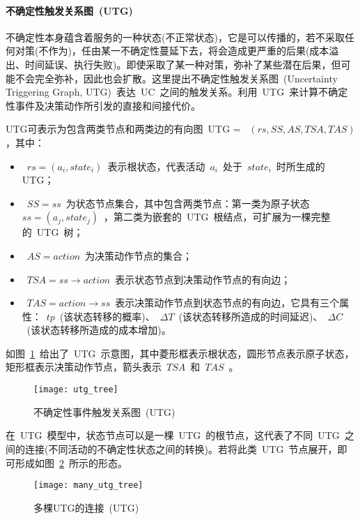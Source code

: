 \paragraph{不确定性触发关系图~(UTG)~} \label{sec:utg}
不确定性本身蕴含着服务的一种状态(不正常状态)，它是可以传播的，若不采取任何对策(不作为)，任由某一不确定性蔓延下去，将会造成更严重的后果(成本溢出、时间延误、执行失败)。即使采取了某一种对策，弥补了某些潜在后果，但可能不会完全弥补，因此也会扩散。这里提出不确定性触发关系图~(Uncertainty Triggering Graph, UTG)~表达~UC~之间的触发关系。利用~UTG~来计算不确定性事件及决策动作所引发的直接和间接代价。

UTG可表示为包含两类节点和两类边的有向图~UTG = ~$(rs, SS, AS, TSA, TAS)$，其中：
\begin{itemize}
    \item ~$rs=(a_i, state_i)$~表示根状态，代表活动~$a_i$~处于~$state_i$~时所生成的UTG；
    \item ~$SS={ss}$~为状态节点集合，其中包含两类节点：第一类为原子状态~$ss=(a_j, state_j)$~，第二类为嵌套的~UTG~根结点，可扩展为一棵完整的~UTG~树；
    \item ~$AS={action}$~为决策动作节点的集合；
    \item ~$TSA=ss \to action$~表示状态节点到决策动作节点的有向边；
    \item ~$TAS=action \to ss$~表示决策动作节点到状态节点的有向边，它具有三个属性：~$tp$~(该状态转移的概率)、~$\Delta T$~(该状态转移所造成的时间延迟)、~$\Delta C$~(该状态转移所造成的成本增加)。
\end{itemize}

如图~\ref{figure:utg_tree}~给出了~UTG~示意图，其中菱形框表示根状态，圆形节点表示原子状态，矩形框表示决策动作节点，箭头表示~$TSA$~和~$TAS$~。

\begin{figure}[htbp]
    \centering
    \texttt{[image: utg\_tree]}
    \caption{不确定性事件触发关系图~(UTG)~}\label{figure:utg_tree}
    \vspace{-1em}
\end{figure}

在~UTG~模型中，状态节点可以是一棵~UTG~的根节点，这代表了不同~UTG~之间的连接(不同活动的不确定性状态之间的转换)。若将此类~UTG~节点展开，即可形成如图~\ref{figure:many_utg_tree}~所示的形态。

\begin{figure}[htbp]
    \centering
    \texttt{[image: many\_utg\_tree]}
    \caption{多棵UTG的连接~(UTG)~}\label{figure:many_utg_tree}
    \vspace{-1em}
\end{figure}

